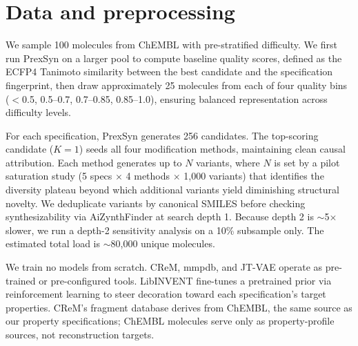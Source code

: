 \section*{Data and preprocessing}

We sample 100 molecules from ChEMBL with pre-stratified difficulty. We first run PrexSyn on a larger pool to compute baseline quality scores, defined as the ECFP4 Tanimoto similarity between the best candidate and the specification fingerprint, then draw approximately 25 molecules from each of four quality bins ($<$0.5, 0.5--0.7, 0.7--0.85, 0.85--1.0), ensuring balanced representation across difficulty levels.

For each specification, PrexSyn generates 256 candidates. The top-scoring candidate ($K=1$) seeds all four modification methods, maintaining clean causal attribution. Each method generates up to $N$ variants, where $N$ is set by a pilot saturation study (5 specs $\times$ 4 methods $\times$ 1,000 variants) that identifies the diversity plateau beyond which additional variants yield diminishing structural novelty. We deduplicate variants by canonical SMILES before checking synthesizability via AiZynthFinder at search depth 1. Because depth 2 is $\sim$5$\times$ slower, we run a depth-2 sensitivity analysis on a 10\% subsample only. The estimated total load is $\sim$80,000 unique molecules.

We train no models from scratch. CReM, mmpdb, and JT-VAE operate as pre-trained or pre-configured tools. LibINVENT fine-tunes a pretrained prior via reinforcement learning to steer decoration toward each specification's target properties. CReM's fragment database derives from ChEMBL, the same source as our property specifications; ChEMBL molecules serve only as property-profile sources, not reconstruction targets.
